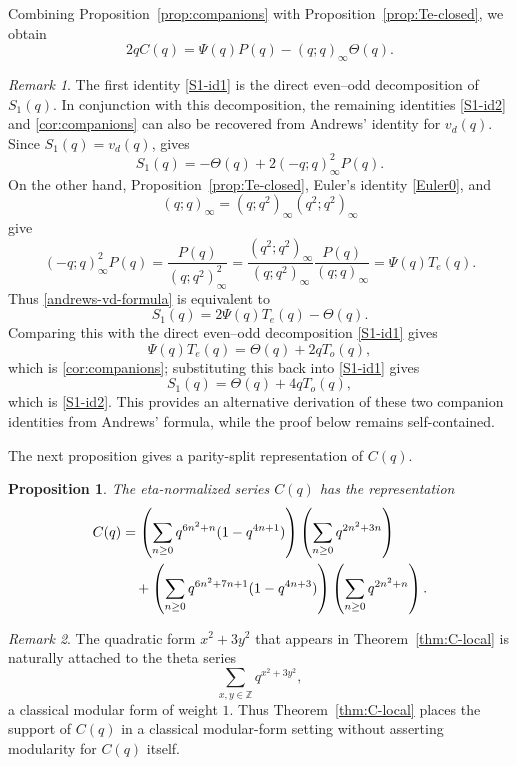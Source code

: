 \documentclass[reqno]{amsart}
\theoremstyle{plain}
\newtheorem{proposition}{Proposition}
\theoremstyle{definition}
\theoremstyle{remark}
\newtheorem{remark}{Remark}
\numberwithin{equation}{section}
\begin{document}
Combining Proposition~\ref{prop:companions} with Proposition~\ref{prop:Te-closed}, we obtain
\begin{equation}\label{C-basic}
2qC(q)=\Psi(q)P(q)-(q;q)_\infty\Theta(q).
\end{equation}

\begin{remark}\label{rem:andrews-vd-proposition}
The first identity \eqref{S1-id1} is the direct even--odd decomposition of $S_1(q)$.
In conjunction with this decomposition, the remaining identities \eqref{S1-id2} and \eqref{cor:companions} can also be recovered from Andrews' identity for $v_d(q)$.
Since $S_1(q)=v_d(q)$, \cite[Theorem~1, (1.4)]{AndrewsConcaveConvex} gives
\begin{equation}\label{andrews-vd-formula}
S_1(q)=-\Theta(q)+2(-q;q)_\infty^2P(q).
\end{equation}
On the other hand, Proposition~\ref{prop:Te-closed}, Euler's identity \eqref{Euler0}, and
\[
(q;q)_\infty=(q;q^2)_\infty(q^2;q^2)_\infty
\]
give
\[
(-q;q)_\infty^2P(q)
=\frac{P(q)}{(q;q^2)_\infty^2}
=\frac{(q^2;q^2)_\infty}{(q;q^2)_\infty}\frac{P(q)}{(q;q)_\infty}
=\Psi(q)T_e(q).
\]
Thus \eqref{andrews-vd-formula} is equivalent to
\[
S_1(q)=2\Psi(q)T_e(q)-\Theta(q).
\]
Comparing this with the direct even--odd decomposition \eqref{S1-id1} gives
\[
\Psi(q)T_e(q)=\Theta(q)+2qT_o(q),
\]
which is \eqref{cor:companions}; substituting this back into \eqref{S1-id1} gives
\[
S_1(q)=\Theta(q)+4qT_o(q),
\]
which is \eqref{S1-id2}.
This provides an alternative derivation of these two companion identities from Andrews' formula, while the proof below remains self-contained.
\end{remark}

The next proposition gives a parity-split representation of $C(q)$.
\begin{proposition}\label{prop:C-structure}
The eta-normalized series $C(q)$ has the representation
\begin{align}
C(q)
&=
\left(\sum_{n\ge 0} q^{6n^2+n}(1-q^{4n+1})\right)
\left(\sum_{n\ge 0} q^{2n^2+3n}\right) \notag\\
&\quad+
\left(\sum_{n\ge 0} q^{6n^2+7n+1}(1-q^{4n+3})\right)
\left(\sum_{n\ge 0} q^{2n^2+n}\right). \label{C-parity-2}
\end{align}
\end{proposition}

\begin{remark}\label{rem:x2-plus-3y2}
The quadratic form $x^2+3y^2$ that appears in Theorem~\ref{thm:C-local} is naturally attached to the theta series
\[
\sum_{x,y\in\mathbb Z} q^{x^2+3y^2},
\]
a classical modular form of weight $1$. Thus Theorem~\ref{thm:C-local} places the support of $C(q)$ in a classical modular-form setting without asserting modularity for $C(q)$ itself.
\end{remark}
%
\end{document}
